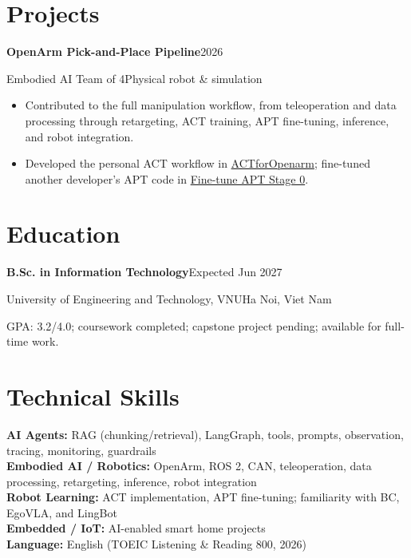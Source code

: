 \documentclass[10pt,a4paper]{article}
\newcommand{\entry}[4]{%
  \textbf{#1}\hfill{\small\color{muted}#2}\par
  {\color{accent}#3}\hfill{\small\color{muted}#4}\par
}
\begin{document}
\section{Projects}
\entry{OpenArm Pick-and-Place Pipeline}{2026}{Embodied AI \textbar{} Team of 4}{Physical robot \& simulation}
\begin{itemize}
  \item Contributed to the full manipulation workflow, from teleoperation and data processing through retargeting, ACT training, APT fine-tuning, inference, and robot integration.
  \item Developed the personal ACT workflow in \href{https://github.com/Tuyen230605/ACTforOpenarm}{ACTforOpenarm}; fine-tuned another developer's APT code in \href{https://github.com/Tuyen230605/Fine_tuneAPT_stage_0}{Fine-tune APT Stage 0}.
\end{itemize}

\section{Education}
\entry{B.Sc. in Information Technology}{Expected Jun 2027}{University of Engineering and Technology, VNU}{Ha Noi, Viet Nam}
GPA: 3.2/4.0; coursework completed; capstone project pending; available for full-time work.

\section{Technical Skills}
\textbf{AI Agents:} RAG (chunking/retrieval), LangGraph, tools, prompts, observation, tracing, monitoring, guardrails\\
\textbf{Embodied AI / Robotics:} OpenArm, ROS 2, CAN, teleoperation, data processing, retargeting, inference, robot integration\\
\textbf{Robot Learning:} ACT implementation, APT fine-tuning; familiarity with BC, EgoVLA, and LingBot\\
\textbf{Embedded / IoT:} AI-enabled smart home projects\\
\textbf{Language:} English (TOEIC Listening \& Reading 800, 2026)
\end{document}
